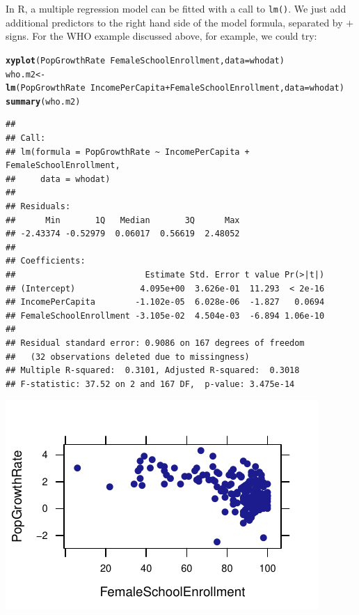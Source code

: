 \documentclass[twoside]{book}\usepackage[]{graphicx}\usepackage[]{xcolor}
\makeatletter
\def\maxwidth{ %
  \ifdim\Gin@nat@width>\linewidth
    \linewidth
  \else
    \Gin@nat@width
  \fi
}
\newcommand{\hlopt}[1]{\textcolor[rgb]{0,0,0}{#1}}%
\newcommand{\hlstd}[1]{\textcolor[rgb]{0.345,0.345,0.345}{#1}}%
\newcommand{\hlkwb}[1]{\textcolor[rgb]{0.69,0.353,0.396}{#1}}%
\newcommand{\hlkwc}[1]{\textcolor[rgb]{0.333,0.667,0.333}{#1}}%
\newcommand{\hlkwd}[1]{\textcolor[rgb]{0.737,0.353,0.396}{\textbf{#1}}}%
\newenvironment{kframe}{%
 \def\at@end@of@kframe{}%
 \ifinner\ifhmode%
  \def\at@end@of@kframe{\end{minipage}}%
  \begin{minipage}{\columnwidth}%
 \fi\fi%
 \def\FrameCommand##1{\hskip\@totalleftmargin \hskip-\fboxsep
 \colorbox{shadecolor}{##1}\hskip-\fboxsep
     \hskip-\linewidth \hskip-\@totalleftmargin \hskip\columnwidth}%
 \MakeFramed {\advance\hsize-\width
   \@totalleftmargin\z@ \linewidth\hsize
   \@setminipage}}%
 {\par\unskip\endMakeFramed%
 \at@end@of@kframe}
\newenvironment{knitrout}{}{} %
\newcounter{example}[section]
\makeatother
\begin{document}
In R, a multiple regression model can be fitted with a call to \texttt{lm()}.  We just add additional predictors to the right hand side of the model formula, separated by $+$ signs. For the WHO example discussed above, for example, we could try:
\begin{knitrout}
\color{fgcolor}\begin{kframe}
\begin{alltt}
\hlkwd{xyplot}\hlstd{(PopGrowthRate} \hlopt{~} \hlstd{FemaleSchoolEnrollment,} \hlkwc{data} \hlstd{= whodat)}
\hlstd{who.m2} \hlkwb{<-} \hlkwd{lm}\hlstd{(PopGrowthRate} \hlopt{~} \hlstd{IncomePerCapita} \hlopt{+} \hlstd{FemaleSchoolEnrollment,} \hlkwc{data} \hlstd{= whodat)}
\hlkwd{summary}\hlstd{(who.m2)}
\end{alltt}
\begin{verbatim}
## 
## Call:
## lm(formula = PopGrowthRate ~ IncomePerCapita + FemaleSchoolEnrollment, 
##     data = whodat)
## 
## Residuals:
##      Min       1Q   Median       3Q      Max 
## -2.43374 -0.52979  0.06017  0.56619  2.48052 
## 
## Coefficients:
##                          Estimate Std. Error t value Pr(>|t|)
## (Intercept)             4.095e+00  3.626e-01  11.293  < 2e-16
## IncomePerCapita        -1.102e-05  6.028e-06  -1.827   0.0694
## FemaleSchoolEnrollment -3.105e-02  4.504e-03  -6.894 1.06e-10
## 
## Residual standard error: 0.9086 on 167 degrees of freedom
##   (32 observations deleted due to missingness)
## Multiple R-squared:  0.3101,	Adjusted R-squared:  0.3018 
## F-statistic: 37.52 on 2 and 167 DF,  p-value: 3.475e-14
\end{verbatim}
\end{kframe}

{\centering \includegraphics[width=\maxwidth]{figures/fig-who_slm2-1} 

}



\end{knitrout}
\end{document}
